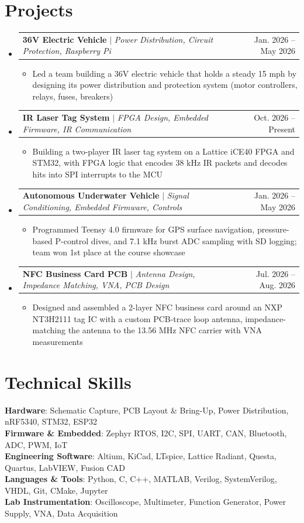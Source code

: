 \documentclass[letterpaper,11pt]{article}
\makeatletter
\newcommand{\resumeItem}[1]{
  \item\small{
    {#1 \vspace{-2pt}}
  }
}
\newcommand{\resumeProjectHeading}[2]{
    \item
    \begin{tabular*}{0.97\textwidth}{l@{\extracolsep{\fill}}r}
      \small#1 & #2 \\
    \end{tabular*}\vspace{-7pt}
}
\newcommand{\resumeSubHeadingListStart}{\begin{itemize}[leftmargin=0.15in, label={}]}
\newcommand{\resumeSubHeadingListEnd}{\end{itemize}}
\newcommand{\resumeItemListStart}{\begin{itemize}}
\newcommand{\resumeItemListEnd}{\end{itemize}\vspace{-5pt}}
\makeatother
\begin{document}
\section{Projects}
\resumeSubHeadingListStart
\resumeProjectHeading
{\textbf{36V Electric Vehicle} $|$ \emph{Power Distribution, Circuit Protection, Raspberry Pi}}{Jan. 2026 -- May 2026}
\resumeItemListStart
\resumeItem{Led a team building a 36V electric vehicle that holds a steady 15 mph by designing its power distribution and protection system (motor controllers, relays, fuses, breakers)}
\resumeItemListEnd
\resumeProjectHeading
{\textbf{IR Laser Tag System} $|$ \emph{FPGA Design, Embedded Firmware, IR Communication}}{Oct. 2026 -- Present}
\resumeItemListStart
\resumeItem{Building a two-player IR laser tag system on a Lattice iCE40 FPGA and STM32, with FPGA logic that encodes 38 kHz IR packets and decodes hits into SPI interrupts to the MCU}
\resumeItemListEnd
\resumeProjectHeading
{\textbf{Autonomous Underwater Vehicle} $|$ \emph{Signal Conditioning, Embedded Firmware, Controls}}{Jan. 2026 -- May 2026}
\resumeItemListStart
\resumeItem{Programmed Teensy 4.0 firmware for GPS surface navigation, pressure-based P-control dives, and 7.1 kHz burst ADC sampling with SD logging; team won 1st place at the course showcase}
\resumeItemListEnd
\resumeProjectHeading
{\textbf{NFC Business Card PCB} $|$ \emph{Antenna Design, Impedance Matching, VNA, PCB Design}}{Jul. 2026 -- Aug. 2026}
\resumeItemListStart
\resumeItem{Designed and assembled a 2-layer NFC business card around an NXP NT3H2111 tag IC with a custom PCB-trace loop antenna, impedance-matching the antenna to the 13.56 MHz NFC carrier with VNA measurements}
\resumeItemListEnd
\resumeSubHeadingListEnd
\section{Technical Skills}
\begin{itemize}[leftmargin=0.15in, label={}]
\small{\item{
\textbf{Hardware}{: Schematic Capture, PCB Layout \& Bring-Up, Power Distribution, nRF5340, STM32, ESP32} \\[3pt]
\textbf{Firmware \& Embedded}{: Zephyr RTOS, I2C, SPI, UART, CAN, Bluetooth, ADC, PWM, IoT} \\[3pt]
\textbf{Engineering Software}{: Altium, KiCad, LTspice, Lattice Radiant, Questa, Quartus, LabVIEW, Fusion CAD} \\[3pt]
\textbf{Languages \& Tools}{: Python, C, C++, MATLAB, Verilog, SystemVerilog, VHDL, Git, CMake, Jupyter} \\[3pt]
\textbf{Lab Instrumentation}{: Oscilloscope, Multimeter, Function Generator, Power Supply, VNA, Data Acquisition}
}}
\end{itemize}
\end{document}
